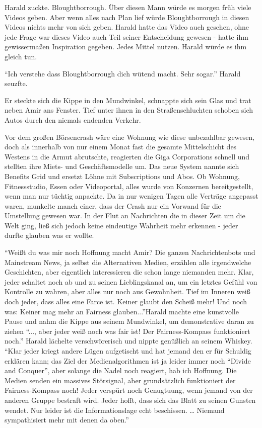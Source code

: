 Harald zuckte. Bloughtborrough. Über diesen Mann würde es morgen früh viele Videos geben. Aber wenn alles nach Plan lief würde Bloughtborrough in diesen Videos nichts mehr von sich geben. Harald hatte das Video auch gesehen, ohne jede Frage war dieses Video auch Teil seiner Entscheidung gewesen - hatte ihm gewissermaßen Inspiration gegeben. Jedes Mittel nutzen. Harald würde es ihm gleich tun.

``Ich verstehe dass Bloughtborrough dich wütend macht. Sehr sogar.'' Harald seuzfte.

Er steckte sich die Kippe in den Mundwinkel, schnappte sich sein Glas und trat neben Amir ans Fenster. Tief unter ihnen in den Straßenschluchten schoben sich Autos durch den niemals endenden Verkehr.

Vor dem großen Börsencrash wäre eine Wohnung wie diese unbezahlbar gewesen, doch als innerhalb von nur einem Monat fast die gesamte Mittelschicht des Westens in die Armut abrutschte, reagierten die Giga Corporations schnell und stellten ihre Miets- und Geschäftsmodelle um. Das neue System nannte sich Benefits Grid und ersetzt Löhne mit Subscriptions und Abos. Ob Wohnung, Fitnessstudio, Essen oder Videoportal, alles wurde von Konzernen bereitgestellt, wenn man nur tüchtig anpackte. Da in nur wenigen Tagen alle Verträge angepasst waren, munkelte manch einer, dass der Crash nur ein Vorwand für die Umstellung gewesen war. In der Flut an Nachrichten die in dieser Zeit um die Welt ging, ließ sich jedoch keine eindeutige Wahrheit mehr erkennen - jeder durfte glauben was er wollte.

“Weißt du was mir noch Hoffnung macht Amir? Die ganzen Nachrichtenbots und Mainstream News, ja selbst die Alternativen Medien, erzählen alle irgendwelche Geschichten, aber eigentlich interessieren die schon lange niemanden mehr. Klar, jeder schaltet noch ab und zu seinen Lieblingskanal an, um ein letztes Gefühl von Kontrolle zu wahren, aber alles nur noch aus Gewohnheit. Tief im Inneren weiß doch jeder, dass alles eine Farce ist. Keiner glaubt den Scheiß mehr! Und noch was: Keiner mag mehr an Fairness glauben...”Harald machte eine kunstvolle Pause und nahm die Kippe aus seinem Mundwinkel, um demonstrative daran zu ziehen
“..., aber jeder weiß noch was fair ist! Der Fairness-Kompass funktioniert noch.” Harald lächelte verschwörerisch und nippte genüßlich an seinem Whiskey. 
“Klar jeder kriegt andere Lügen aufgetischt und hat jemand den er für Schuldig erklären kann; das Ziel der Medienalgorithmen ist ja leider immer noch “Divide and Conquer”, aber solange die Nadel noch reagiert, hab ich Hoffnung. Die Medien senden ein massives Störsignal, aber grundsätzlich funktioniert der Fairness-Kompass noch! Jeder verspürt noch Genugtuung, wenn jemand von der anderen Gruppe bestraft wird. Jeder hofft, dass sich das Blatt zu seinen Gunsten wendet. Nur leider ist die Informationslage echt beschissen.
…
 Niemand sympathisiert mehr mit denen da oben.”

